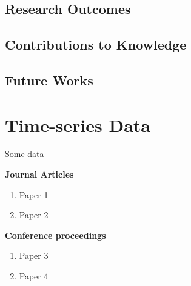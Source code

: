 \documentclass{utmthesis}
\begin{document}
\section{Research Outcomes}
\section{Contributions to Knowledge}
\section{Future Works}

%



\appendix
\chapter{Time-series Data}
Some data

\listofpublications

\noindent \textbf{Journal Articles}
\begin{enumerate}
\item Paper 1
\item Paper 2
\end{enumerate}

\noindent\textbf{Conference proceedings}
\begin{enumerate}
\item Paper 3
\item Paper 4
\end{enumerate}


\endmatter
\end{document}
